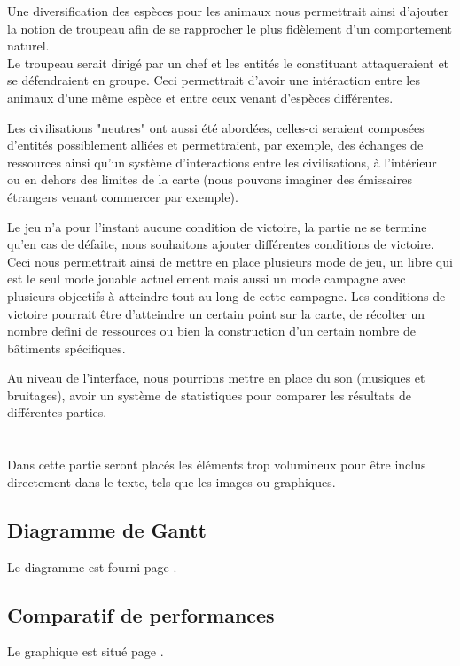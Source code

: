 \documentclass[a4paper]{memoir}
\begin{document}
			Une diversification des espèces pour les animaux nous permettrait ainsi d'ajouter la notion de troupeau afin de se rapprocher le plus fidèlement d'un comportement naturel.\\
			Le troupeau serait dirigé par un chef et les entités le constituant attaqueraient et se défendraient en groupe. Ceci permettrait d'avoir une intéraction entre les animaux d'une même espèce et entre ceux venant d'espèces différentes.
			
			Les civilisations "neutres" ont aussi été abordées, celles-ci seraient composées d'entités possiblement alliées et permettraient, par exemple, des échanges de ressources ainsi qu'un système d'interactions entre les civilisations, à l'intérieur ou en dehors des limites de la carte (nous pouvons imaginer des émissaires étrangers venant commercer par exemple).
			
			Le jeu n'a pour l'instant aucune condition de victoire, la partie ne se termine qu'en cas de défaite, nous souhaitons ajouter différentes conditions de victoire. Ceci nous permettrait ainsi de mettre en place plusieurs mode de jeu, un libre qui est le seul mode jouable actuellement mais aussi un mode campagne avec plusieurs objectifs à atteindre tout au long de cette campagne. Les conditions de victoire pourrait être d'atteindre un certain point sur la carte, de récolter un nombre defini de ressources ou bien la construction d'un certain nombre de bâtiments spécifiques.
			
			Au niveau de l'interface, nous pourrions mettre en place du son (musiques et bruitages), avoir un système de statistiques pour comparer les résultats de différentes parties.
	
	\appendix
	\chapter{}
		Dans cette partie seront placés les éléments trop volumineux pour être inclus directement dans le texte, tels que les images ou graphiques.\\
		
		\section{Diagramme de Gantt}
			Le diagramme est fourni page \pageref{fig:gantt}.
			
		\section{Comparatif de performances}
			Le graphique est situé page \pageref{fig:analyse}.
			
\end{document}
